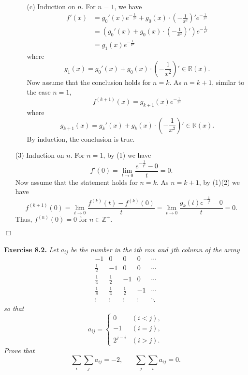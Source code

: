 \documentclass{article}
\begin{document}
\begin{enumerate}
\begin{enumerate}
  \item[(c)]
  Induction on $n$.
  For $n = 1$, we have
  \begin{align*}
    f'(x)
    &= g_0'(x) e^{-\frac{1}{x^2}}
      + g_0(x) \cdot \left( -\frac{1}{x^2} \right)' e^{-\frac{1}{x^2}} \\
    &= \left( g_0'(x) + g_0(x) \cdot \left( -\frac{1}{x^2} \right)' \right) e^{-\frac{1}{x^2}} \\
    &= g_1(x) e^{-\frac{1}{x^2}}
  \end{align*}
  where
  \[
    g_1(x) = g_0'(x) + g_0(x) \cdot \left(-\frac{1}{x^2}\right)' \in \mathbb{R}(x).
  \]
  Now assume that the conclusion holds for $n = k$.
  As $n = k + 1$, similar to the case $n = 1$,
  \[
    f^{(k + 1)}(x) = g_{k + 1}(x) e^{-\frac{1}{x^2}}
  \]
  where
  \[
    g_{k + 1}(x)
    = g_k'(x) + g_k(x) \cdot \left( -\frac{1}{x^2} \right)' \in \mathbb{R}(x).
  \]
  By induction, the conclusion is true.
  \end{enumerate}

\item[(3)]
Induction on $n$.
For $n = 1$, by (1) we have
\[
  f'(0) = \lim_{t \rightarrow 0} \frac{e^{- \frac{1}{t^2}} - 0}{t} = 0.
\]
Now assume that the statement holds for $n = k$.
As $n = k + 1$, by (1)(2) we have
\[
  f^{(k + 1)}(0)
  = \lim_{t \rightarrow 0} \frac{f^{(k)}(t) - f^{(k)}(0)}{t}
  = \lim_{t \rightarrow 0} \frac{g_k(t) e^{- \frac{1}{t^2}} - 0}{t} = 0.
\]
Thus, $f^{(n)}(0) = 0$ for $n \in \mathbb{Z}^+$.
\end{enumerate}
$\Box$ \\\\






\textbf{Exercise 8.2.}
\emph{Let $a_{ij}$ be the number in the $i$th row and $j$th column of the array
\[
\begin{array}{rrrrr}
           -1 &           0 &           0 &      0 & \cdots \\
  \frac{1}{2} &          -1 &           0 &      0 & \cdots \\
  \frac{1}{4} & \frac{1}{2} &          -1 &      0 & \cdots \\
  \frac{1}{8} & \frac{1}{4} & \frac{1}{2} &     -1 & \cdots \\
       \vdots &      \vdots &      \vdots & \vdots & \ddots
\end{array}
\]
so that
\begin{equation*}
  a_{ij} =
    \begin{cases}
      0       & (i < j), \\
      -1      & (i = j), \\
      2^{j-i} & (i > j).
    \end{cases}
\end{equation*}
Prove that
\[
  \sum_{i} \sum_{j} a_{ij} = -2, \:\:\:\:\:\:\:\: \sum_{j} \sum_{i} a_{ij} = 0.
\]
} \\
\end{document}
